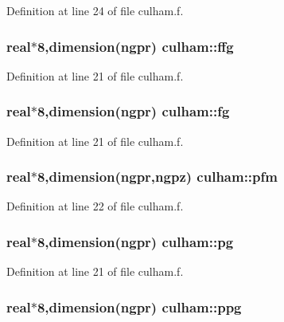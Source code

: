 Definition at line 24 of file culham.f.\hypertarget{namespaceculham_806bc97fe7b18abe6b5946609135d94a}{
\subsubsection[ffg]{\setlength{\rightskip}{0pt plus 5cm}real$\ast$8,dimension(ngpr) {\bf culham::ffg}}}
\label{namespaceculham_806bc97fe7b18abe6b5946609135d94a}




Definition at line 21 of file culham.f.\hypertarget{namespaceculham_eebfdf9a86b2f50ca0ec4b0df055cd58}{
\subsubsection[fg]{\setlength{\rightskip}{0pt plus 5cm}real$\ast$8,dimension(ngpr) {\bf culham::fg}}}
\label{namespaceculham_eebfdf9a86b2f50ca0ec4b0df055cd58}




Definition at line 21 of file culham.f.\hypertarget{namespaceculham_5d193536b9f85a25d4431dd85c1c4de6}{
\subsubsection[pfm]{\setlength{\rightskip}{0pt plus 5cm}real$\ast$8,dimension(ngpr,ngpz) {\bf culham::pfm}}}
\label{namespaceculham_5d193536b9f85a25d4431dd85c1c4de6}




Definition at line 22 of file culham.f.\hypertarget{namespaceculham_debc8d3361a57d8b688866b6232f731c}{
\subsubsection[pg]{\setlength{\rightskip}{0pt plus 5cm}real$\ast$8,dimension(ngpr) {\bf culham::pg}}}
\label{namespaceculham_debc8d3361a57d8b688866b6232f731c}




Definition at line 21 of file culham.f.\hypertarget{namespaceculham_395214ac6cbef35696c876fd56b18907}{
\subsubsection[ppg]{\setlength{\rightskip}{0pt plus 5cm}real$\ast$8,dimension(ngpr) {\bf culham::ppg}}}
\label{namespaceculham_395214ac6cbef35696c876fd56b18907}




